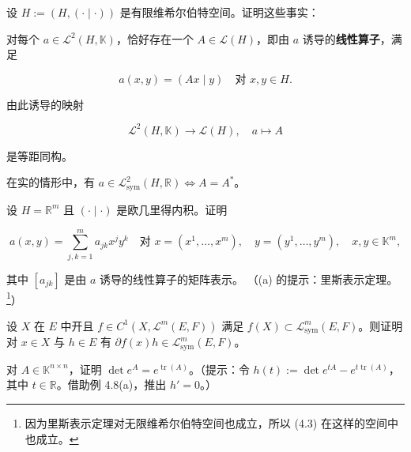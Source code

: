 \exerciseshead

\begin{exercises}
\item

设 $ H := (H,(\cdot \mid \cdot)) $ 是有限维希尔伯特空间。证明这些事实：

\begin{items}
\item

对每个 $ a \in \mathcal{L}^{2}(H,\mathbb{K}) $，恰好存在一个 $ A \in \mathcal{L}(H) $，即由 $ a $ 诱导的\textbf{线性算子}，满足

\[
a(x,y) = (Ax \mid y) \quad \text{对 } x, y \in H .
\]

由此诱导的映射

\begin{equation}
\mathcal{L}^{2}(H,\mathbb{K}) \to \mathcal{L}(H) , \quad a \mapsto A\tag{4.3}
\end{equation}

是等距同构。

\item

在实的情形中，有 $ a \in \mathcal{L}^{2}_{\mathrm{sym}}(H,\mathbb{R}) \iff A = A^{*} $。

\item

设 $ H = \mathbb{R}^{m} $ 且 $ (\cdot \mid \cdot) $ 是欧几里得内积。证明

\[
a(x,y) = \sum_{j,k=1}^{m} a_{jk}x^{j}y^{k} \quad \text{对 } x = (x^{1},\ldots,x^{m}) , \quad y = (y^{1},\ldots,y^{m}) , \quad x, y \in \mathbb{K}^{m} ,
\]

其中 $ [a_{jk}] $ 是由 $ a $ 诱导的线性算子的矩阵表示。
（(a) 的提示：里斯表示定理。\footnote{因为里斯表示定理对无限维希尔伯特空间也成立，所以 (4.3) 在这样的空间中也成立。}）

\end{items}

\item

设 $ X $ 在 $ E $ 中开且 $ f \in C^{1}(X,\mathcal{L}^{m}(E,F)) $ 满足 $ f(X) \subset \mathcal{L}^{m}_{\mathrm{sym}}(E,F) $。则证明对 $ x \in X $ 与 $ h \in E $ 有 $ \partial f(x)h \in \mathcal{L}^{m}_{\mathrm{sym}}(E,F) $。

\item

对 $ A \in \mathbb{K}^{n \times n} $，证明 $ \det e^{A} = e^{\operatorname{tr}(A)} $。（提示：令 $ h(t) := \det e^{tA} - e^{t\operatorname{tr}(A)} $，其中 $ t \in \mathbb{R} $。借助例 4.8(a)，推出 $ h' = 0 $。）


\end{exercises}
